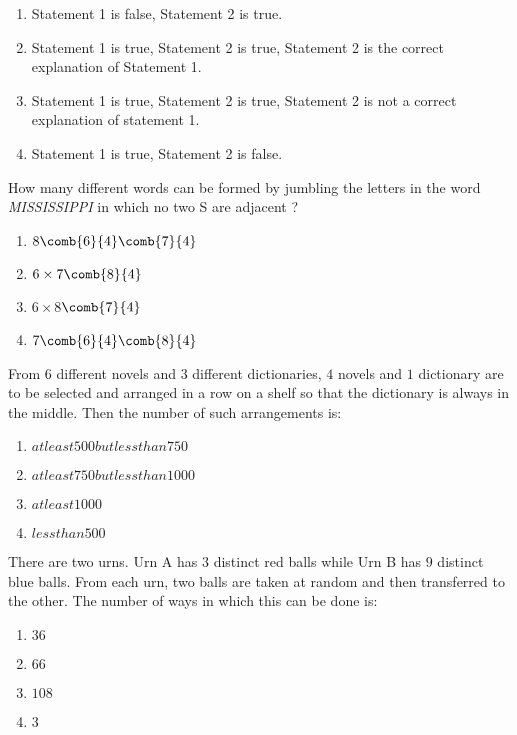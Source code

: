  \begin{enumerate}
     \item Statement 1 is false, Statement 2 is true.
     \item Statement 1 is true, Statement 2 is true, Statement 2 is the correct explanation of Statement 1.
     \item Statement 1 is true, Statement 2 is true, Statement 2 is not a correct explanation of statement 1.
     \item Statement 1 is true, Statement 2 is false.
 \end{enumerate}
\item  How many different words can be formed by jumbling the letters in the word \emph{MISSISSIPPI} in which no two S are adjacent ?
	\begin{multicols}{2}
	\begin{enumerate}
		\item $8 \comb{6}{4} \comb {7}{4}$
		\item $6\times7 \comb{8}{4}$
		\item $6\times8$$\comb{7}{4}$
		\item $ 7 \comb{6}{4} \comb {8}{4}$
        \end{enumerate}
	\end{multicols}
\item From $6$ different novels and $3$ different dictionaries, $4$ novels and $1$ dictionary are to be selected and arranged in a row on a shelf so that the dictionary is always in the middle. Then the number of such arrangements is: \hfill{}
 \begin{enumerate}
     \item $at least 500 but less than 750$
     \item $at least 750 but less than 1000$
     \item $at least 1000$
     \item $less than 500$
 \end{enumerate}
\item There are two urns. Urn A has $3$ distinct red balls while Urn B has $9$ distinct blue balls. From each urn, two balls are taken at random and then transferred to the other. The number of ways in which this can be done is: \hfill{}
	\begin{multicols}{4}
	\begin{enumerate}
     \item $36$
     \item $66$
     \item $108$
     \item $3$
        \end{enumerate}
	\end{multicols}
